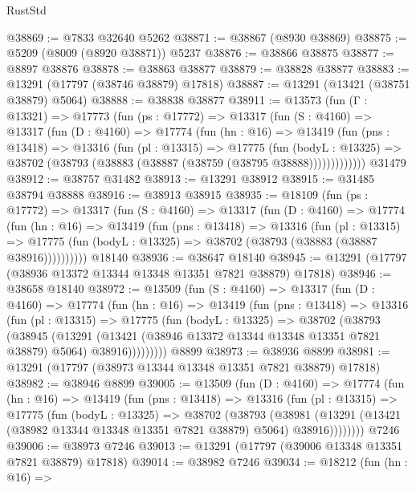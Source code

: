 \begin{lexlean}{RustStd}
\begin{coremodule}
@38869 := @7833 @32640 @5262
@38871 := @38867 (@8930 @38869)
@38875 := @5209 (@8009 (@8920 @38871)) @5237
@38876 := @38866 @38875
@38877 := @8897 @38876
@38878 := @38863 @38877
@38879 := @38828 @38877
@38883 := @13291 (@17797 (@38746 @38879) @17818)
@38887 := @13291 (@13421 (@38751 @38879) @5064)
@38888 := @38838 @38877
@38911 := @13573
    (fun (Γ : @13321) =>
    @17773
      (fun (ps : @17772) =>
      @13317
        (fun (S : @4160) =>
        @13317
          (fun (D : @4160) =>
          @17774
            (fun (hn : @16) =>
            @13419
              (fun (pns : @13418) =>
              @13316
                (fun (pl : @13315) =>
                @17775
                  (fun (bodyL : @13325) =>
                  @38702 (@38793 (@38883 (@38887 (@38759 (@38795 @38888)))))))))))))
    @31479
@38912 := @38757 @31482
@38913 := @13291 @38912
@38915 := @31485 @38794 @38888
@38916 := @38913 @38915
@38935 := @18109
    (fun (ps : @17772) =>
    @13317
      (fun (S : @4160) =>
      @13317
        (fun (D : @4160) =>
        @17774
          (fun (hn : @16) =>
          @13419
            (fun (pns : @13418) =>
            @13316
              (fun (pl : @13315) =>
              @17775 (fun (bodyL : @13325) => @38702 (@38793 (@38883 (@38887 @38916))))))))))
    @18140
@38936 := @38647 @18140
@38945 := @13291 (@17797 (@38936 @13372 @13344 @13348 @13351 @7821 @38879) @17818)
@38946 := @38658 @18140
@38972 := @13509
    (fun (S : @4160) =>
    @13317
      (fun (D : @4160) =>
      @17774
        (fun (hn : @16) =>
        @13419
          (fun (pns : @13418) =>
          @13316
            (fun (pl : @13315) =>
            @17775
              (fun (bodyL : @13325) =>
              @38702
                (@38793
                  (@38945
                    (@13291
                      (@13421 (@38946 @13372 @13344 @13348 @13351 @7821 @38879) @5064)
                      @38916)))))))))
    @8899
@38973 := @38936 @8899
@38981 := @13291 (@17797 (@38973 @13344 @13348 @13351 @7821 @38879) @17818)
@38982 := @38946 @8899
@39005 := @13509
    (fun (D : @4160) =>
    @17774
      (fun (hn : @16) =>
      @13419
        (fun (pns : @13418) =>
        @13316
          (fun (pl : @13315) =>
          @17775
            (fun (bodyL : @13325) =>
            @38702
              (@38793
                (@38981
                  (@13291 (@13421 (@38982 @13344 @13348 @13351 @7821 @38879) @5064) @38916))))))))
    @7246
@39006 := @38973 @7246
@39013 := @13291 (@17797 (@39006 @13348 @13351 @7821 @38879) @17818)
@39014 := @38982 @7246
@39034 := @18212
    (fun (hn : @16) =>

\end{coremodule}
\end{lexlean}
